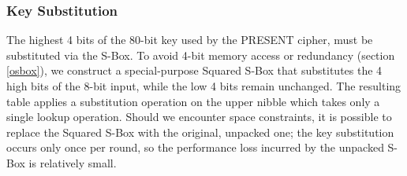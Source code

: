 \documentclass[11pt]{llncs2e} %
\begin{document}
\subsubsection{Key Substitution}
The highest 4 bits of the 80-bit key used by the PRESENT cipher, must be substituted via the S-Box. To avoid 4-bit memory access or redundancy (section \ref{osbox}), we construct a special-purpose Squared S-Box that substitutes the 4 high bits of the 8-bit input, while the low 4 bits remain unchanged. The resulting table applies a substitution operation on the upper nibble which takes only a single lookup operation. Should we encounter space constraints, it is possible to replace the Squared S-Box with the original, unpacked one; the key substitution occurs only once per round, so the performance loss incurred by the unpacked S-Box is relatively small. 




\end{document}
